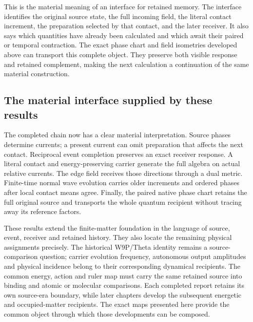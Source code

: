 This is the material meaning of an interface for retained memory. The interface identifies the original source state, the full incoming field, the literal contact increment, the preparation selected by that contact, and the later receiver. It also says which quantities have already been calculated and which await their paired or temporal contraction. The exact phase chart and field isometries developed above can transport this complete object. They preserve both visible response and retained complement, making the next calculation a continuation of the same material construction.

\subsection{The material interface supplied by these results}

The completed chain now has a clear material interpretation. Source phases determine currents; a present current can omit preparation that affects the next contact. Reciprocal event completion preserves an exact receiver response. A literal contact and energy-preserving carrier generate the full algebra on actual relative currents. The edge field receives those directions through a dual metric. Finite-time normal wave evolution carries older increments and ordered phases after local contact means agree. Finally, the paired native phase chart retains the full original source and transports the whole quantum recipient without tracing away its reference factors.

These results extend the finite-matter foundation in the language of source, event, receiver and retained history. They also locate the remaining physical assignments precisely. The historical W9P/Theta identity remains a source-comparison question; carrier evolution frequency, autonomous output amplitudes and physical incidence belong to their corresponding dynamical recipients. The common energy, action and ruler map must carry the same retained source into binding and atomic or molecular comparisons. Each completed report retains its own source-era boundary, while later chapters develop the subsequent energetic and occupied-matter recipients. The exact maps presented here provide the common object through which those developments can be composed.
